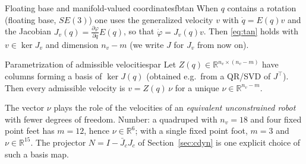 \documentclass[11pt,a4paper]{article}
\newcommand{\R}{\mathbb{R}}
\newcommand{\Jc}{J_c}
\newcommand{\Jb}{\bar{J}_c}
\begin{document}
\begin{corollary}{Floating base and manifold-valued coordinates}{fbtan}
When $q$ contains a rotation (floating base, $SE(3)$) one uses the generalized velocity
$v$ with $\dot q=E(q)v$ and the Jacobian $J_v(q)=\frac{\partial\varphi}{\partial q}E(q)$, so that
$\dot\varphi=J_v(q)v$. Then \eqref{eq:tan} holds with $v\in\ker J_v$ and dimension
$n_v-m$ (we write $J$ for $J_v$ from now on).
\end{corollary}

\begin{proposition}{Parametrization of admissible velocities}{par}
Let $Z(q)\in\R^{n_v\times(n_v-m)}$ have columns forming a basis of $\ker J(q)$ (obtained
e.g.\ from a QR/SVD of $J^\top$). Then every admissible velocity is $v=Z(q)\,\nu$ for a unique
$\nu\in\R^{n_v-m}$.
\end{proposition}

\begin{intuition}
The vector $\nu$ plays the role of the velocities of an \emph{equivalent unconstrained
robot} with fewer degrees of freedom. Number: a quadruped with $n_v=18$ and four fixed point
feet has $m=12$, hence $\nu\in\R^{6}$; with a single fixed point foot, $m=3$ and $\nu\in\R^{15}$.
The projector $N=I-\Jb\Jc$ of Section~\ref{sec:cdyn} is one explicit choice of such a basis map.
\end{intuition}
\end{document}
